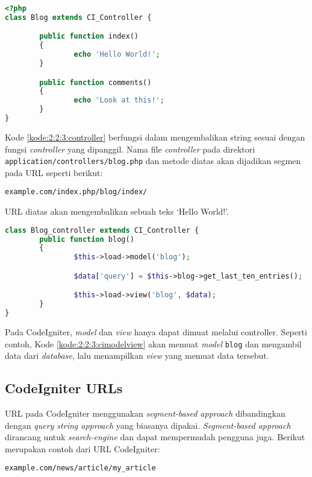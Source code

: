 \begin{lstlisting}[language=php, caption={Contoh \textit{controller}}, label={kode:2:2:3:controller}]
<?php
class Blog extends CI_Controller {

		public function index()
		{
				echo 'Hello World!';
		}

		public function comments()
		{
				echo 'Look at this!';
		}
}
\end{lstlisting}

Kode \ref{kode:2:2:3:controller} berfungsi dalam mengembalikan string sesuai dengan fungsi \textit{controller} yang dipanggil. Nama file \textit{controller} pada direktori \verb|application/controllers/blog.php| dan metode diatas akan dijadikan segmen pada URL seperti berikut:

\begin{center}
	\verb|example.com/index.php/blog/index/|
\end{center}

URL diatas akan mengembalikan sebuah teks `Hello World!'.

\begin{lstlisting}[language=php, caption=Contoh memuat \textit{model} dan menampilkan \textit{view}, label=kode:2:2:3:cimodelview]
class Blog_controller extends CI_Controller {
		public function blog()
		{
				$this->load->model('blog');

				$data['query'] = $this->blog->get_last_ten_entries();

				$this->load->view('blog', $data);
		}
}
\end{lstlisting}

Pada CodeIgniter, \textit{model} dan \textit{view} hanya dapat dimuat melalui controller. Seperti contoh, Kode \ref{kode:2:2:3:cimodelview} akan memuat \textit{model} \verb|blog| dan mengambil data dari \textit{database}, lalu menampilkan \textit{view} yang memuat data tersebut.

\subsection{CodeIgniter URLs}
\label{sub:2:2:codeigniterurls}

URL pada CodeIgniter menggunakan \textit{segment-based approach} dibandingkan dengan \textit{query string approach} yang biasanya dipakai. \textit{Segment-based approach} dirancang untuk \textit{search-engine} dan dapat mempermudah pengguna juga. Berikut merupakan contoh dari URL CodeIgniter:

\begin{center}
	\verb|example.com/news/article/my_article|
\end{center}

